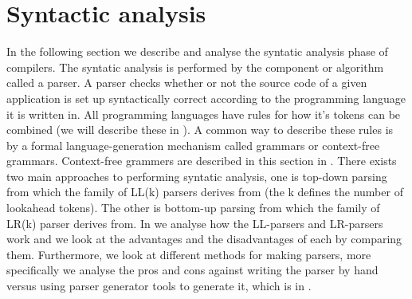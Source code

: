 \section{Syntactic analysis}

In the following section we describe and analyse the syntatic analysis phase of
compilers. The syntatic analysis is performed by the component or algorithm
called a parser. A parser checks whether or not the source code of a given
application is set up syntactically correct according to the programming
language it is written in. All programming languages have rules for how it's
tokens can be combined (we will describe these in ).
A common way to describe these rules is by a formal language-generation
mechanism called grammars or context-free grammars. Context-free grammers are
described in this section in . There exists two
main approaches to performing syntatic analysis, one is top-down parsing from
which the family of LL(k) parsers derives from (the k defines the number of
lookahead tokens). The other is bottom-up parsing from which the family of LR(k)
parser derives from. In  we analyse how the
LL-parsers and LR-parsers work and we look at the advantages and the
disadvantages of each by comparing them. Furthermore, we look at different
methods for making parsers, more specifically we analyse the pros and cons
against writing the parser by hand versus using parser generator tools to
generate it, which is in .





